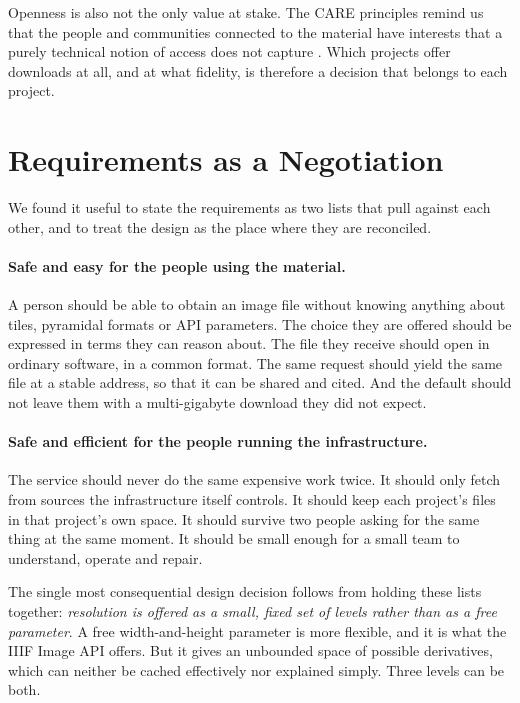 \documentclass{dhnbpub}
\begin{document}
Openness is also not the only value at stake. The CARE principles
remind us that the people and communities connected to the material
have interests that a purely technical notion of access does not
capture \citep{carroll2020}. Which projects offer downloads at all, and
at what fidelity, is therefore a decision that belongs to each project.

\section{Requirements as a Negotiation}

We found it useful to state the requirements as two lists that pull
against each other, and to treat the design as the place where they
are reconciled.

\paragraph{Safe and easy for the people using the material.}
A person should be able to obtain an image file without knowing
anything about tiles, pyramidal formats or API parameters. The choice
they are offered should be expressed in terms they can reason about.
The file they receive should open in ordinary software, in a common
format. The same request should yield the same file at a stable
address, so that it can be shared and cited. And the default should not
leave them with a multi-gigabyte download they did not expect.

\paragraph{Safe and efficient for the people running the infrastructure.}
The service should never do the same expensive work twice. It should
only fetch from sources the infrastructure itself controls. It should
keep each project's files in that project's own space. It should
survive two people asking for the same thing at the same moment. It
should be small enough for a small team to understand, operate and
repair.

The single most consequential design decision follows from holding
these lists together: \emph{resolution is offered as a small, fixed set
of levels rather than as a free parameter}. A free width-and-height
parameter is more flexible, and it is what the IIIF Image API offers.
But it gives an unbounded space of possible derivatives, which can
neither be cached effectively nor explained simply. Three levels can be
both.
\end{document}
